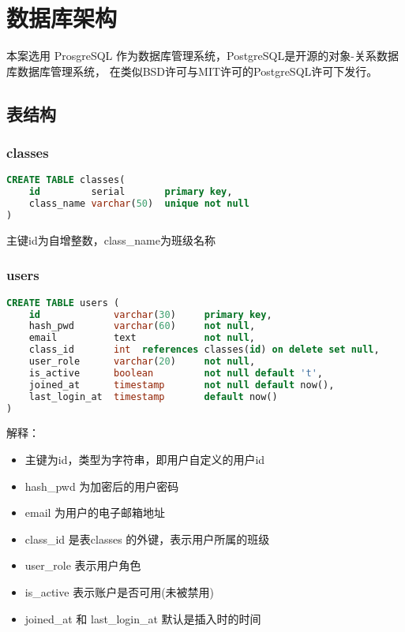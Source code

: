 \section{数据库架构}
本案选用 ProsgreSQL 作为数据库管理系统，PostgreSQL是开源的对象-关系数据库数据库管理系统，
在类似BSD许可与MIT许可的PostgreSQL许可下发行。

\subsection{表结构}
\subsubsection{classes}
\begin{lstlisting}[language = SQL]
CREATE TABLE classes(
    id         serial       primary key,
    class_name varchar(50)  unique not null
)
\end{lstlisting}
主键id为自增整数，class\_name为班级名称
\subsubsection{users}
\begin{lstlisting}[language = SQL]
CREATE TABLE users (
    id             varchar(30)     primary key,
    hash_pwd       varchar(60)     not null,
    email          text            not null,
    class_id       int  references classes(id) on delete set null,
    user_role      varchar(20)     not null,
    is_active      boolean         not null default 't',
    joined_at      timestamp       not null default now(),
    last_login_at  timestamp       default now()
)
\end{lstlisting}
解释：
\begin{itemize}
    \item 主键为id，类型为字符串，即用户自定义的用户id
    \item hash\_pwd 为加密后的用户密码
    \item email 为用户的电子邮箱地址
    \item class\_id 是表classes 的外键，表示用户所属的班级
    \item user\_role 表示用户角色
    \item is\_active 表示账户是否可用(未被禁用)
    \item joined\_at 和 last\_login\_at 默认是插入时的时间
\end{itemize}

